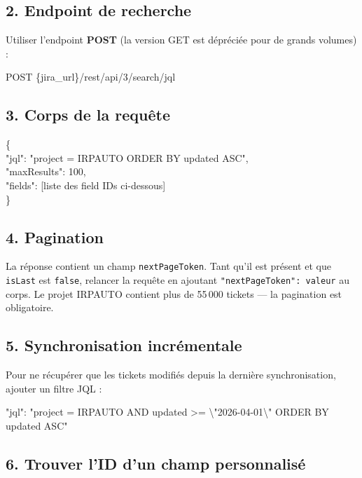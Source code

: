 \documentclass[12pt, a4paper]{article}
\begin{document}
\subsection{2. Endpoint de recherche}

Utiliser l'endpoint \textbf{POST} (la version GET est dépréciée pour de grands volumes) :

\begin{purplebox}
\small\ttfamily
POST \{jira\_url\}/rest/api/3/search/jql
\end{purplebox}

\subsection{3. Corps de la requête}

\begin{purplebox}
\small\ttfamily
\{\\
\quad "jql": "project = IRPAUTO ORDER BY updated ASC",\\
\quad "maxResults": 100,\\
\quad "fields": [liste des field IDs ci-dessous]\\
\}
\end{purplebox}

\subsection{4. Pagination}

La réponse contient un champ \texttt{nextPageToken}. Tant qu'il est présent et que
\texttt{isLast} est \texttt{false}, relancer la requête en ajoutant
\texttt{"nextPageToken": valeur} au corps. Le projet IRPAUTO contient plus de
55\,000 tickets — la pagination est obligatoire.

\subsection{5. Synchronisation incrémentale}

Pour ne récupérer que les tickets modifiés depuis la dernière synchronisation,
ajouter un filtre JQL :

\begin{purplebox}
\small\ttfamily
"jql": "project = IRPAUTO AND updated >= \textbackslash"2026-04-01\textbackslash" ORDER BY updated ASC"
\end{purplebox}

\subsection{6. Trouver l'ID d'un champ personnalisé}
\end{document}
